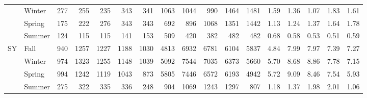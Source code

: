 \begin{sidewaystable}[!h]
\begin{tabular}{llrrrrrrrrrrrrrrr}
		                    & Winter & 277   & 255   & 235   & 343   & 341   & 1063  & 1044  & 990   & 1464 & 1481   & 1.59 & 1.36 & 1.07 & 1.83 & 1.61 \\
		                    & Spring & 175   & 222   & 276   & 343   & 343   & 692   & 896   & 1068  & 1351 & 1442   & 1.13 & 1.24 & 1.37 & 1.64 & 1.78 \\
		                    & Summer & 124   & 115   & 115   & 141   & 153   & 509   & 420   & 382   & 482  & 482    & 0.68 & 0.58 & 0.53 & 0.51 & 0.59 \\
		\cmidrule{2-17}
		\multirow{4}{*}{SY} & Fall   & 940   & 1257  & 1227  & 1188  & 1030  & 4813  & 6932  & 6781  & 6104 & 5837   & 4.84 & 7.99 & 7.97 & 7.39 & 7.27 \\
		                    & Winter & 974   & 1323  & 1255  & 1148  & 1039  & 5092  & 7544  & 7035  & 6373 & 5660   & 5.70 & 8.68 & 8.86 & 7.78 & 7.15 \\
		                    & Spring & 994   & 1242  & 1119  & 1043  & 873   & 5805  & 7446  & 6572  & 6193 & 4942   & 5.72 & 9.09 & 8.46 & 7.54 & 5.93 \\
		                    & Summer & 275   & 322   & 335   & 336   & 248   & 904   & 1069  & 1243  & 1297 & 807    & 1.18 & 1.37 & 1.98 & 2.01 & 1.06 \\
		\bottomrule
	\end{tabular}
\end{sidewaystable}


\afterpage{\global\pdfpageattr\expandafter{\the\pdfpageattr/Rotate 0}}

